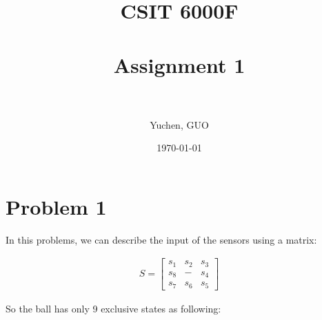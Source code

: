 \documentclass[paper=a4, fontsize=11pt]{scrartcl} %
\title{	
\normalfont \normalsize 
\textsc{CSIT 6000F} \\ [25pt] %
\horrule{0.5pt} \\[0.4cm] %
\huge Assignment 1 \\ %
\horrule{2pt} \\[0.5cm] %
}
\author{Yuchen, GUO} %
\date{\normalsize\today} %
\numberwithin{equation}{section} %
\numberwithin{figure}{section} %
\numberwithin{table}{section} %
\begin{document}
\maketitle %


\section{Problem 1}

In this problems, we can describe the input of the sensors using a matrix:

\begin{align*}
S = 
\begin{bmatrix}
    s_1 & s_2 & s_3\\
    s_8 & - & s_4\\
    s_7 & s_6 & s_5
\end{bmatrix}
\end{align*}

So the ball has only 9 exclusive states as following:
\end{document}
